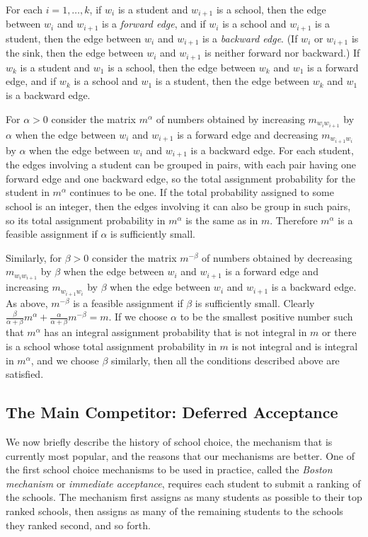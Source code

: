 \documentclass[12pt]{article}
\theoremstyle{definition}
\begin{document}
For each $i = 1, \ldots, k$, if $w_i$ is a student and $w_{i+1}$ is a
school, then the edge between $w_i$ and $w_{i+1}$ is a \emph{forward
edge}, and if $w_i$ is a school and $w_{i+1}$ is a student, then the
edge between $w_i$ and $w_{i+1}$ is a \emph{backward edge}.  (If $w_i$
or $w_{i+1}$ is the sink, then the edge between $w_i$ and $w_{i+1}$ is
neither forward nor backward.)  If $w_k$ is a student and $w_1$ is a
school, then the edge between $w_k$ and $w_1$ is a forward edge, and
if $w_k$ is a school and $w_1$ is a student, then the edge between
$w_k$ and $w_1$ is a backward edge.

For $\alpha > 0$ consider the matrix $m^\alpha$ of numbers obtained by
increasing $m_{w_iw_{i+1}}$ by $\alpha$ when the edge between $w_i$
and $w_{i+1}$ is a forward edge and decreasing $m_{w_{i+1}w_i}$ by
$\alpha$ when the edge between $w_i$ and $w_{i+1}$ is a backward edge.
For each student, the edges involving a student can be grouped in
pairs, with each pair having one forward edge and one backward edge,
so the total assignment probability for the student in $m^\alpha$
continues to be one.  If the total probability assigned to some school
is an integer, then the edges involving it can also be group in such
pairs, so its total assignment probability in $m^\alpha$ is the same
as in $m$.  Therefore $m^\alpha$ is a feasible assignment if $\alpha$
is sufficiently small.  

Similarly, for $\beta > 0$ consider the matrix $m^{-\beta}$ of numbers
obtained by decreasing $m_{w_iw_{i+1}}$ by $\beta$ when the edge
between $w_i$ and $w_{i+1}$ is a forward edge and increasing
$m_{w_{i+1}w_i}$ by $\beta$ when the edge between $w_i$ and $w_{i+1}$
is a backward edge.  As above, $m^{-\beta}$ is a feasible assignment
if $\beta$ is sufficiently small.  Clearly $\tfrac{\beta}{\alpha +
  \beta}m^\alpha + \tfrac{\alpha}{\alpha + \beta}m^{-\beta} = m$.  If
we choose $\alpha$ to be the smallest positive number such that
$m^\alpha$ has an integral assignment probability that is not integral
in $m$ or there is a school whose total assignment probability in $m$
is not integral and is integral in $m^\alpha$, and we choose $\beta$
similarly, then all the conditions described above are satisfied.

\subsection{The Main Competitor: Deferred Acceptance} \label{subsec:DeferredAcceptance}

We now briefly describe the history of school choice, the mechanism
that is currently most popular, and the reasons that our mechanisms
are better.  One of the first school choice mechanisms to be used in
practice, called the \emph{Boston mechanism} or \emph{immediate
acceptance}, requires each student to submit a ranking of the schools.
The mechanism first assigns as many students as possible to their top
ranked schools, then assigns as many of the remaining students to the
schools they ranked second, and so forth.
\end{document}
